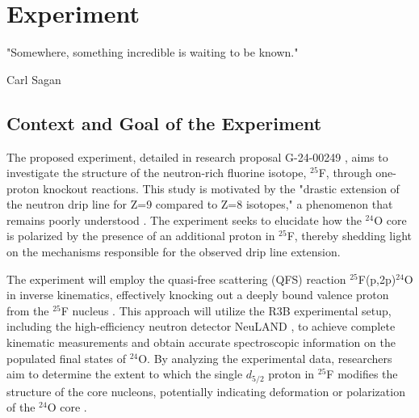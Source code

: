 
%

\makeatletter
\newcommand{\ntifpkgloaded}{%
  \@ifpackageloaded%
}
\makeatother


\chapter{Experiment}
\label{cha:experiment}

\epigraph{
	"Somewhere, something incredible is waiting to be known."
}{Carl Sagan}



\section{Context and Goal of the Experiment} %
\label{sec:contex_goal_experiment}

The proposed experiment, detailed in research proposal G-24-00249 \cite{panin2024neutron}, aims to investigate the structure of the neutron-rich fluorine isotope, $^{25}$F, through one-proton knockout reactions. This study is motivated by the "drastic extension of the neutron drip line for Z=9 compared to Z=8 isotopes," a phenomenon that remains poorly understood \cite{ahn_location_2019}. The experiment seeks to elucidate how the $^{24}$O core is polarized by the presence of an additional proton in $^{25}$F, thereby shedding light on the mechanisms responsible for the observed drip line extension.

The experiment will employ the quasi-free scattering (\gls{QFS}) reaction $^{25}$F(p,2p)$^{24}$O in inverse kinematics, effectively knocking out a deeply bound valence proton from the $^{25}$F nucleus \cite{panin_exclusive_2016}. This approach will utilize the \gls{R3B} experimental setup, including the high-efficiency neutron detector NeuLAND \cite{boretzky_neuland_2021}, to achieve complete kinematic measurements and obtain accurate spectroscopic information on the populated final states of $^{24}$O. By analyzing the experimental data, researchers aim to determine the extent to which the single $d_{5/2}$ proton in $^{25}$F modifies the structure of the core nucleons, potentially indicating deformation or polarization of the $^{24}$O core \cite{macchiavelli_core_2020}.

